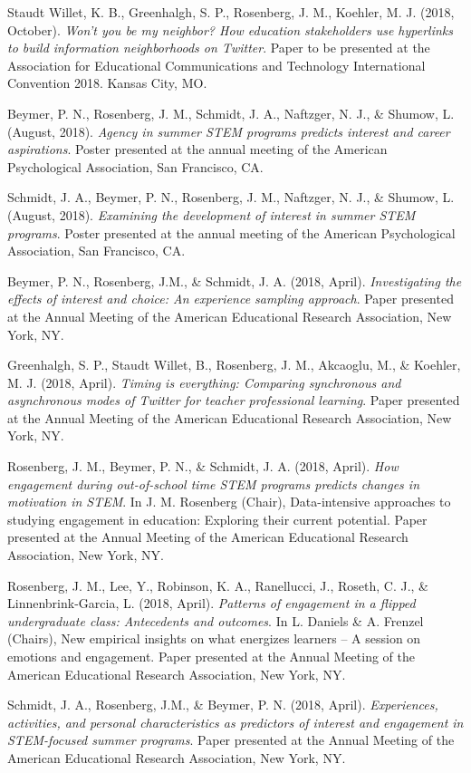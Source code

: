 \documentclass[14,]{article}
\begin{document}
Staudt Willet, K. B., Greenhalgh, S. P., Rosenberg, J. M., Koehler, M.
J. (2018, October). \emph{Won't you be my neighbor? How education
stakeholders use hyperlinks to build information neighborhoods on
Twitter}. Paper to be presented at the Association for Educational
Communications and Technology International Convention 2018. Kansas
City, MO.

Beymer, P. N., Rosenberg, J. M., Schmidt, J. A., Naftzger, N. J., \&
Shumow, L. (August, 2018). \emph{Agency in summer STEM programs predicts
interest and career aspirations}. Poster presented at the annual meeting
of the American Psychological Association, San Francisco, CA.

Schmidt, J. A., Beymer, P. N., Rosenberg, J. M., Naftzger, N. J., \&
Shumow, L. (August, 2018). \emph{Examining the development of interest
in summer STEM programs}. Poster presented at the annual meeting of the
American Psychological Association, San Francisco, CA.

Beymer, P. N., Rosenberg, J.M., \& Schmidt, J. A. (2018, April).
\emph{Investigating the effects of interest and choice: An experience
sampling approach}. Paper presented at the Annual Meeting of the
American Educational Research Association, New York, NY.

Greenhalgh, S. P., Staudt Willet, B., Rosenberg, J. M., Akcaoglu, M., \&
Koehler, M. J. (2018, April). \emph{Timing is everything: Comparing
synchronous and asynchronous modes of Twitter for teacher professional
learning}. Paper presented at the Annual Meeting of the American
Educational Research Association, New York, NY.

Rosenberg, J. M., Beymer, P. N., \& Schmidt, J. A. (2018, April).
\emph{How engagement during out-of-school time STEM programs predicts
changes in motivation in STEM}. In J. M. Rosenberg (Chair),
Data-intensive approaches to studying engagement in education: Exploring
their current potential. Paper presented at the Annual Meeting of the
American Educational Research Association, New York, NY.

Rosenberg, J. M., Lee, Y., Robinson, K. A., Ranellucci, J., Roseth, C.
J., \& Linnenbrink-Garcia, L. (2018, April). \emph{Patterns of
engagement in a flipped undergraduate class: Antecedents and outcomes}.
In L. Daniels \& A. Frenzel (Chairs), New empirical insights on what
energizes learners -- A session on emotions and engagement. Paper
presented at the Annual Meeting of the American Educational Research
Association, New York, NY.

Schmidt, J. A., Rosenberg, J.M., \& Beymer, P. N. (2018, April).
\emph{Experiences, activities, and personal characteristics as
predictors of interest and engagement in STEM-focused summer programs}.
Paper presented at the Annual Meeting of the American Educational
Research Association, New York, NY.
\end{document}
